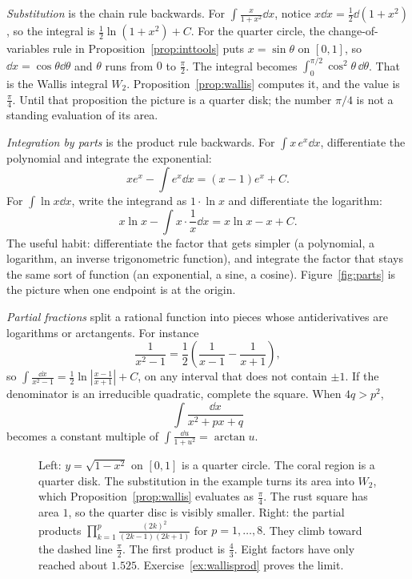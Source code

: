 \begin{examplex}
\emph{Substitution} is the chain rule backwards. For $\int\frac{x}{1+x^2}\dd x$, notice $x\dd x=\frac12\dd(1+x^2)$, so the integral is $\frac12\ln(1+x^2)+C$. For the quarter circle, the change-of-variables rule in Proposition~\ref{prop:inttools} puts $x=\sin\theta$ on $[0,1]$, so $\dd x=\cos\theta\dd\theta$ and $\theta$ runs from $0$ to $\frac\pi2$. The integral becomes $\int_0^{\pi/2}\cos^2\theta\,\dd\theta$. That is the Wallis integral $W_2$. Proposition~\ref{prop:wallis} computes it, and the value is $\frac\pi4$. Until that proposition the picture is a quarter disk; the number $\pi/4$ is not a standing evaluation of its area.

\emph{Integration by parts} is the product rule backwards. For $\int x\,e^x\dd x$, differentiate the polynomial and integrate the exponential:
\[
xe^x-\int e^x\dd x=(x-1)e^x+C.
\]
For $\int\ln x\dd x$, write the integrand as $1\cdot\ln x$ and differentiate the logarithm:
\[
x\ln x-\int x\cdot\frac1x\dd x=x\ln x-x+C.
\]
The useful habit: differentiate the factor that gets simpler (a polynomial, a logarithm, an inverse trigonometric function), and integrate the factor that stays the same sort of function (an exponential, a sine, a cosine). Figure~\ref{fig:parts} is the picture when one endpoint is at the origin.

\emph{Partial fractions} split a rational function into pieces whose antiderivatives are logarithms or arctangents. For instance
\[
\frac1{x^2-1}=\frac12\left(\frac1{x-1}-\frac1{x+1}\right),
\]
so $\int\frac{\dd x}{x^2-1}=\frac12\ln\left|\frac{x-1}{x+1}\right|+C$, on any interval that does not contain $\pm1$. If the denominator is an irreducible quadratic, complete the square. When $4q>p^2$,
\[
\int\frac{\dd x}{x^2+px+q}
\]
becomes a constant multiple of $\int\frac{\dd u}{1+u^2}=\arctan u$.
\end{examplex}

\begin{figure}[ht]
\centering
{}
\caption{Left: $y=\sqrt{1-x^2}$ on $[0,1]$ is a quarter circle. The coral region is a quarter disk. The substitution in the example turns its area into $W_2$, which Proposition~\ref{prop:wallis} evaluates as $\frac\pi4$. The rust square has area $1$, so the quarter disc is visibly smaller. Right: the partial products $\prod_{k=1}^p\frac{(2k)^2}{(2k-1)(2k+1)}$ for $p=1,\ldots,8$. They climb toward the dashed line $\frac\pi2$. The first product is $\frac43$. Eight factors have only reached about $1.525$. Exercise~\ref{ex:wallisprod} proves the limit.}
\label{fig:quarter}
\end{figure}

